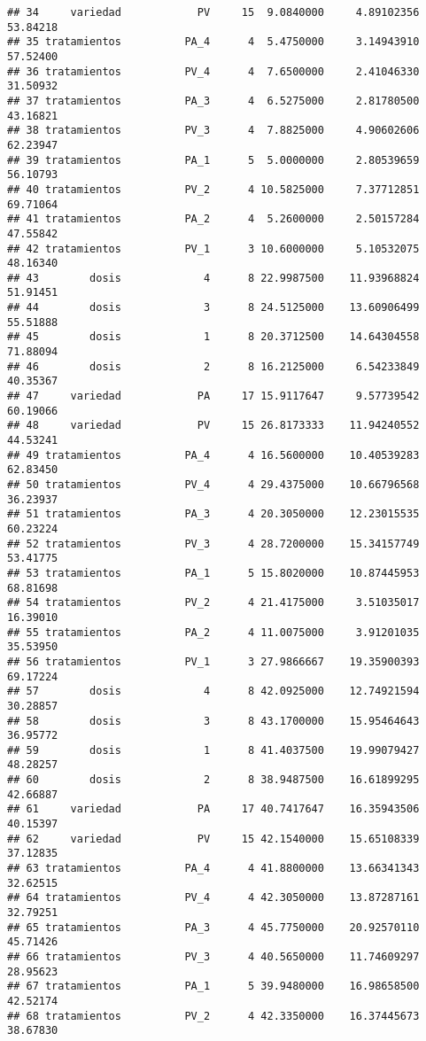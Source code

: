 \documentclass[
]{article}
\begin{document}
\begin{verbatim}
## 34     variedad            PV     15  9.0840000     4.89102356 53.84218
## 35 tratamientos          PA_4      4  5.4750000     3.14943910 57.52400
## 36 tratamientos          PV_4      4  7.6500000     2.41046330 31.50932
## 37 tratamientos          PA_3      4  6.5275000     2.81780500 43.16821
## 38 tratamientos          PV_3      4  7.8825000     4.90602606 62.23947
## 39 tratamientos          PA_1      5  5.0000000     2.80539659 56.10793
## 40 tratamientos          PV_2      4 10.5825000     7.37712851 69.71064
## 41 tratamientos          PA_2      4  5.2600000     2.50157284 47.55842
## 42 tratamientos          PV_1      3 10.6000000     5.10532075 48.16340
## 43        dosis             4      8 22.9987500    11.93968824 51.91451
## 44        dosis             3      8 24.5125000    13.60906499 55.51888
## 45        dosis             1      8 20.3712500    14.64304558 71.88094
## 46        dosis             2      8 16.2125000     6.54233849 40.35367
## 47     variedad            PA     17 15.9117647     9.57739542 60.19066
## 48     variedad            PV     15 26.8173333    11.94240552 44.53241
## 49 tratamientos          PA_4      4 16.5600000    10.40539283 62.83450
## 50 tratamientos          PV_4      4 29.4375000    10.66796568 36.23937
## 51 tratamientos          PA_3      4 20.3050000    12.23015535 60.23224
## 52 tratamientos          PV_3      4 28.7200000    15.34157749 53.41775
## 53 tratamientos          PA_1      5 15.8020000    10.87445953 68.81698
## 54 tratamientos          PV_2      4 21.4175000     3.51035017 16.39010
## 55 tratamientos          PA_2      4 11.0075000     3.91201035 35.53950
## 56 tratamientos          PV_1      3 27.9866667    19.35900393 69.17224
## 57        dosis             4      8 42.0925000    12.74921594 30.28857
## 58        dosis             3      8 43.1700000    15.95464643 36.95772
## 59        dosis             1      8 41.4037500    19.99079427 48.28257
## 60        dosis             2      8 38.9487500    16.61899295 42.66887
## 61     variedad            PA     17 40.7417647    16.35943506 40.15397
## 62     variedad            PV     15 42.1540000    15.65108339 37.12835
## 63 tratamientos          PA_4      4 41.8800000    13.66341343 32.62515
## 64 tratamientos          PV_4      4 42.3050000    13.87287161 32.79251
## 65 tratamientos          PA_3      4 45.7750000    20.92570110 45.71426
## 66 tratamientos          PV_3      4 40.5650000    11.74609297 28.95623
## 67 tratamientos          PA_1      5 39.9480000    16.98658500 42.52174
## 68 tratamientos          PV_2      4 42.3350000    16.37445673 38.67830

\end{verbatim}
\end{document}
